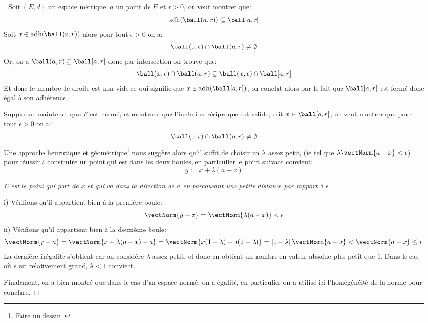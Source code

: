 \documentclass{report}
\begin{document}
      \subsection*{}
   \begin{proof}[\unskip\nopunct]
      Soit \((E, d)\) un espace métrique, \(a\) un point de \(E\) et \(r > 0\), on veut montrer que:
      \[
         \text{adh}(\ball(a, r)) \subseteq \ball[a, r]   
      \]
      Soit \(x \in \text{adh}(\ball(a, r))\) alors pour tout \(\epsilon > 0\) on a:
      \[
         \ball(x, \epsilon) \cap \ball(a, r) \neq \emptyset 
      \]
      Or, on a \(\ball(a, r) \subseteq \ball[a, r]\) donc par intersection on trouve que:
      \[
         \ball(x, \epsilon) \cap \ball(a, r) \subseteq  \ball(x, \epsilon) \cap \ball[a, r]
      \]
      Et donc le membre de droite est non vide ce qui signifie que \(x \in \text{adh}(\ball[a, r])\), on conclut alors par le fait que \(\ball[a, r]\) est fermé donc égal à son adhérence.\pagebreak

      Supposons maintenat que \(E\) est normé, et montrons que l'inclusion réciproque est valide, soit \(x \in \ball[a, r]\), on veut montrer que pour tout \(\epsilon > 0\) on a:
      \[
         \ball(x, \epsilon) \cap \ball(a, r) \neq \emptyset
      \]
      Une approche heuristique et géométrique\footnote[1]{Faire un dessin !} nous suggère alors qu'il suffit de choisir un \(\lambda\) assez petit, (ie tel que \(\lambda \vectNorm{a - x} < \epsilon\)) pour réussir à construire un point qui est dans les deux boules, en particulier le point suivant convient:
      \[
         y := x + \lambda(a - x) 
      \]
      \begin{center}
         \textit{C'est le point qui part de \(x\) et qui va dans la direction de \(a\) en parcourant une petite distance par rapport à \(\epsilon\)}
      \end{center}
      i) Vérifions qu'il appartient bien à la première boule:
      \[
         \vectNorm{y - x} = \vectNorm{\lambda(a - x)} < \epsilon 
      \]
      ii) Vérifions qu'il appartient bien à la deuxième boule:
      \[
         \vectNorm{y - a} = \vectNorm{x + \lambda(a - x) - a} = \vectNorm{x(1 - \lambda) - a(1 - \lambda)} = \left|1-\lambda\right|\vectNorm{a - x} < \vectNorm{a - x} \leq r
      \]
      La dernière inégalité s'obtient car on considère \(\lambda\) assez petit, et donc on obtient un nombre en valeur absolue plus petit que \(1\). Dans le cas où \(\epsilon\) est relativement grand, \(\lambda < 1\) convient.\<
      
      Finalement, on a bien montré que dans le cas d'un espace normé, on a égalité, en particulier on a utilisé ici l'homégénéité de la norme pour conclure.
   \end{proof}     
   
\end{document}
